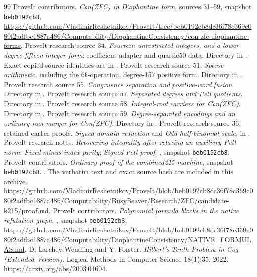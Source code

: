 \documentclass[11pt,a4paper]{article}
\theoremstyle{remark}\newtheorem{remark}[theorem]{Remark}
\newcommand{\pin}{\texttt{beb0192cb8}}
\begin{document}
\begin{thebibliography}{99}
 ProveIt contributors.
\emph{Con(ZFC) in Diophantine form}, sources 31--59, snapshot \pin.
\url{https://github.com/VladimirReshetnikov/ProveIt/tree/beb0192cb8dc36f78c369c080f2adfbc1887a486/Computability/DiophantineConsistency/con-zfc-diophantine-forms}.
 ProveIt research source 34.
\emph{Fourteen unrestricted integers, and a lower-degree fifteen-integer form};
coefficient adapter and quartic50 data. Directory 
in \cite{collection}. Exact copied source identities are in
.
 ProveIt research source 51.
\emph{Sparse arithmetic}, including the 66-operation, degree-157 positive
form. Directory  in \cite{collection}.
 ProveIt research source 55.
\emph{Congruence separation and positive-word fusion}.
Directory  in \cite{collection}.
 ProveIt research source 57.
\emph{Separated degrees and Pell quotients}.
Directory  in \cite{collection}.
 ProveIt research source 58.
\emph{Integral-root carriers for Con(ZFC)}.
Directory  in \cite{collection}.
 ProveIt research source 59.
\emph{Degree-separated encodings and an ordinary-root merger for Con(ZFC)}.
Directory  in \cite{collection}.
 ProveIt research source 36, retained earlier proofs.
\emph{Signed-domain reduction} and \emph{Odd half-binomial scale}.
 in \cite{collection}.
 ProveIt research notes.
\emph{Recovering integrality after relaxing an auxiliary Pell norm};
\emph{Fixed-minus index parity}; \emph{Signed Pell proof}.
, snapshot \pin.
 ProveIt contributors.
\emph{Ordinary proof of the combined215 machine}, snapshot \pin.
.
The verbatim text and exact source hash are included in this archive.
\url{https://github.com/VladimirReshetnikov/ProveIt/blob/beb0192cb8dc36f78c369c080f2adfbc1887a486/Computability/BusyBeaver/Research/ZFC/candidate-k215/proof.md}.
 ProveIt contributors.
\emph{Polynomial formula blocks in the native refutation graph},
, snapshot \pin.
\url{https://github.com/VladimirReshetnikov/ProveIt/blob/beb0192cb8dc36f78c369c080f2adfbc1887a486/Computability/DiophantineConsistency/NATIVE_FORMULAS.md}.
 D. Larchey-Wendling and Y. Forster.
\emph{Hilbert's Tenth Problem in Coq (Extended Version)}.
Logical Methods in Computer Science 18(1):35, 2022.
\url{https://arxiv.org/abs/2003.04604}.
\end{thebibliography}
\end{document}

